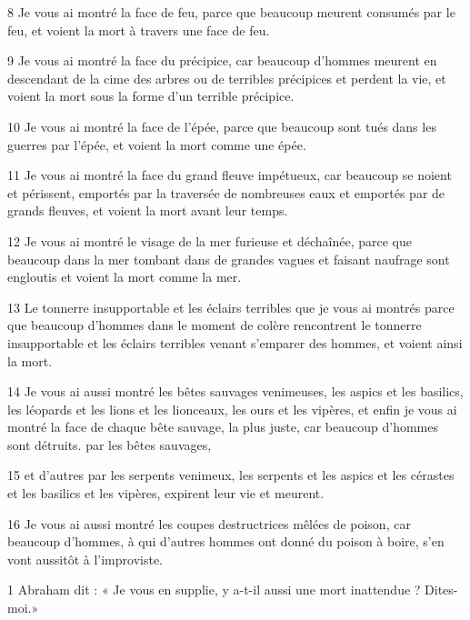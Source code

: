 \par 8 Je vous ai montré la face de feu, parce que beaucoup meurent consumés par le feu, et voient la mort à travers une face de feu.

\par 9 Je vous ai montré la face du précipice, car beaucoup d'hommes meurent en descendant de la cime des arbres ou de terribles précipices et perdent la vie, et voient la mort sous la forme d'un terrible précipice.

\par 10 Je vous ai montré la face de l'épée, parce que beaucoup sont tués dans les guerres par l'épée, et voient la mort comme une épée.

\par 11 Je vous ai montré la face du grand fleuve impétueux, car beaucoup se noient et périssent, emportés par la traversée de nombreuses eaux et emportés par de grands fleuves, et voient la mort avant leur temps.

\par 12 Je vous ai montré le visage de la mer furieuse et déchaînée, parce que beaucoup dans la mer tombant dans de grandes vagues et faisant naufrage sont engloutis et voient la mort comme la mer.

\par 13 Le tonnerre insupportable et les éclairs terribles que je vous ai montrés parce que beaucoup d'hommes dans le moment de colère rencontrent le tonnerre insupportable et les éclairs terribles venant s'emparer des hommes, et voient ainsi la mort.

\par 14 Je vous ai aussi montré les bêtes sauvages venimeuses, les aspics et les basilics, les léopards et les lions et les lionceaux, les ours et les vipères, et enfin je vous ai montré la face de chaque bête sauvage, la plus juste, car beaucoup d'hommes sont détruits. par les bêtes sauvages,

\par 15 et d'autres par les serpents venimeux, les serpents et les aspics et les cérastes et les basilics et les vipères, expirent leur vie et meurent.

\par 16 Je vous ai aussi montré les coupes destructrices mêlées de poison, car beaucoup d'hommes, à qui d'autres hommes ont donné du poison à boire, s'en vont aussitôt à l'improviste.


\par 1 Abraham dit : « Je vous en supplie, y a-t-il aussi une mort inattendue ? Dites-moi.»

